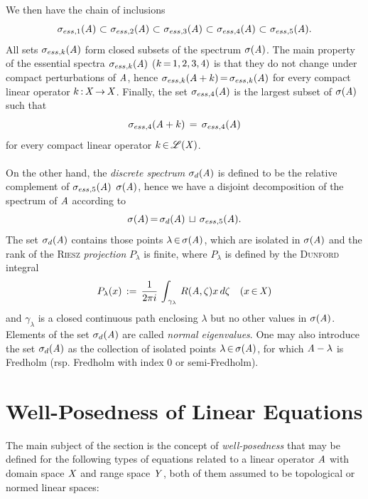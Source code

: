\documentclass[11pt,twoside]{article}
\begin{document}
\subparagraph{} %
We then have the chain of inclusions 
\[
\sigma_{ess,1}(\mathit{A}) \, {\,\subset\,} \,
\sigma_{ess,2}(\mathit{A}) \, {\,\subset\,} \,
\sigma_{ess,3}(\mathit{A}) \, {\,\subset\,} \,
\sigma_{ess,4}(\mathit{A}) \, {\,\subset\,} \,
\sigma_{ess,5}(\mathit{A}).
\]
All sets $\sigma_{ess,k}(\mathit{A})$ form closed subsets
of the spectrum $\sigma(\mathit{A})$.
The main property of the essential spectra $\sigma_{ess,k}(\mathit{A})$
($k {\,=\,} 1,2,3,4)$ is
that they do not change under compact perturbations of $\mathit{A}$,
hence $\sigma_{ess,k}(\mathit{A} + k) {\,=\,} \sigma_{ess,k}(\mathit{A})$
for every compact linear operator $k {\,:\,} \mathit{X} {\,\to\,} \mathit{X}$.
Finally,
the set $\sigma_{ess,4}(\mathit{A})$ is the largest subset of $\sigma(\mathit{A})$
such that
\[
\sigma_{ess,4}(\mathit{A} + k)
\,=\,
\sigma_{ess,4}(\mathit{A})
\]
for every compact linear operator $k {\,\in\,} \mathscr{L}(\mathit{X})$.

\paragraph{} %
On the other hand,
the \textit{discrete spectrum} $\sigma_d(\mathit{A})$ is defined
to be the relative complement of $\sigma_{ess,5}(\mathit{A})$ {\wrt} $\sigma(\mathit{A})$,
hence we have a disjoint decomposition of the spectrum of $\mathit{A}$ according to
\[
\sigma(\mathit{A}) {\,=\,} \sigma_d(\mathit{A}) \, \sqcup \, \sigma_{ess,5}(\mathit{A}).
\]
The set $\sigma_d(\mathit{A})$ contains those points $\lambda {\,\in\,} \sigma(\mathit{A})$,
which are isolated in $\sigma(\mathit{A})$ and the rank of the \textsc{Riesz}
\textit{projection} $P_{\lambda}$ is finite,
where $P_{\lambda}$ is defined by the \textsc{Dunford} integral
\[
P_{\lambda}(x) \,:=\,
\frac{1}{2 \pi i} \, \int_{\,\gamma_{\lambda}} \, R(\mathit{A},\zeta) x \, d\zeta
\quad (x {\,\in\,} \mathit{X})
\]
and $\gamma_{\lambda}$ is a closed continuous path enclosing $\lambda$
but no other values in $\sigma(\mathit{A})$.
Elements of the set $\sigma_d(\mathit{A})$ are called \textit{normal eigenvalues}.
One may also introduce the set $\sigma_d(\mathit{A})$ as the collection
of isolated points $\lambda {\,\in\,} \sigma(\mathit{A})$,
for which $\mathit{A}-\lambda$ is Fredholm
(rsp. Fredholm with index $0$ or semi-Fredholm).

\section{Well-Posedness of Linear Equations}                                   %
The main subject of the section is the concept of \textit{well-posedness}
that may be defined for the following types of equations
related to a linear operator $\mathit{A}$
with domain space $\mathit{X}$ and range space $\mathit{Y}$,
both of them assumed to be topological or normed linear spaces:
\end{document}
